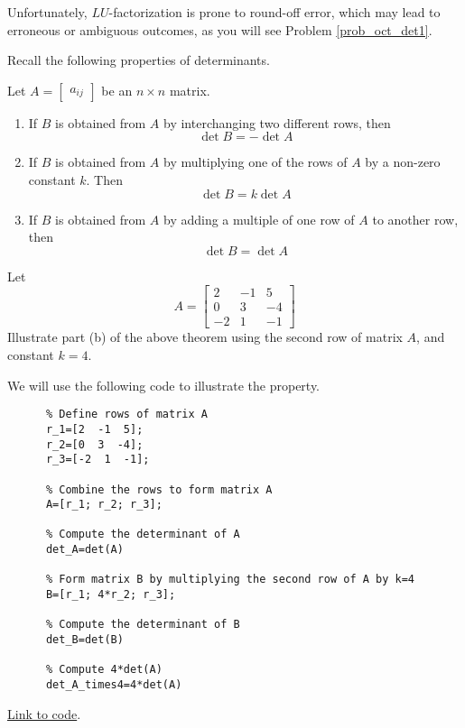 \documentclass{ximera}
\begin{document}
Unfortunately, $LU$-factorization is prone to round-off error, which may lead to erroneous or ambiguous outcomes, as you will see Problem \ref{prob_oct_det1}.

Recall the following properties of determinants.

\begin{theorem}[\ref{th:elemrowopsanddet}]
  Let $A=\begin{bmatrix}a_{ij}\end{bmatrix}$ be an $n\times n$ matrix. 
  \begin{enumerate}
  \item\label{item:rowswapanddet}
  If $B$ is obtained from $A$ by interchanging two different rows, then $$\det{B}=-\det{A}$$
  \item \label{item:rowconstantmultanddet}
  If $B$ is obtained from $A$ by multiplying one of the rows of $A$ by a non-zero constant $k$.  Then $$\det{B}=k\det{A}$$
  \item \label{item:addmultotherrowdet}
  If $B$ is obtained from $A$ by adding a multiple of one row of $A$ to another row, then
  $$\det{B}=\det{A}$$
  \end{enumerate}
  \end{theorem}

\begin{example}\label{ex_det_prop}
  Let $$A=\begin{bmatrix}
  2 & -1 & 5\\0 & 3 & -4\\-2 & 1 & -1
  \end{bmatrix}$$
  Illustrate part (b) of the above theorem using the second row of matrix $A$, and constant $k=4$.
  \begin{explanation}
    We will use the following code to illustrate the property.
    \begin{verbatim}
      % Define rows of matrix A
      r_1=[2  -1  5];
      r_2=[0  3  -4];
      r_3=[-2  1  -1];

      % Combine the rows to form matrix A
      A=[r_1; r_2; r_3];

      % Compute the determinant of A
      det_A=det(A)

      % Form matrix B by multiplying the second row of A by k=4
      B=[r_1; 4*r_2; r_3];

      % Compute the determinant of B
      det_B=det(B)

      % Compute 4*det(A)
      det_A_times4=4*det(A)
    \end{verbatim}

    \href{https://sagecell.sagemath.org/?z=eJyVjrEKgzAURXfBf3iLUAWhajpJBtPSn5AiWmMbahKJkda_bxIV3EqXNxzuO5wALrRjgoKS7xFkB7zWin2g8D1VJbhMAeIE4HTLLUhxeQTIDEMLyHAZm0liV5b4XgBnyRtr1M_VqiV0UvGdusClsedgjPZku9dh0strSzVVnIlaaNtlvgypCmzuoQiX_XWnJdDMwKdes6GfmXg4yUjvUrQ2wzns5IWR75E1AEV_JJAlgbgEEv7co2hrdeWVZpyOCG_4C2FMb7M=&lang=octave&interacts=eJyLjgUAARUAuQ==}{Link to code}.
  \end{explanation}

\end{example}
\end{document}
